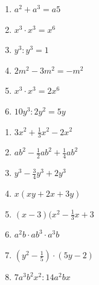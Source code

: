 \begin{exercicios}


\begin{multicols}{2}

\begin{enumerate}[label=\alph*)]

\item $a^2  + a^3  = a5$

\item $x^3  \cdot  x^3 = x^6$

\item $y^3 : y^3 = 1$

\item $2m^2 - 3m^2 = -m^2$

\item $x^3 \cdot x^3 = 2x^6$

\item $10y^3 : 2y^2 = 5y$

\end{enumerate}

\end{multicols}


\begin{multicols}{2}

\begin{enumerate}[label=\alph*)]
    \item $3x^2 + \frac{1}{3}x^2 - 2x^2$
    
    \item $ab^2 - \frac{1}{2}ab^2 + \frac{1}{4}ab^2$
    
    \item $y^3 - \frac{3}{4}y^3 + 2y^3$
    
    \item $x(xy+2x+3y)$
    
    \item $(x-3)(x^2-\frac{1}{3}x+3$
    
    \item $a^2b \cdot ab^3 \cdot a^3b$
    
    \item $(y^2-\frac{1}{5}) \cdot (5y-2)$
    
    \item $7a^3b^2x^2 : 14a^2bx$
    

\end{enumerate}
\end{multicols}
\end{exercicios}
